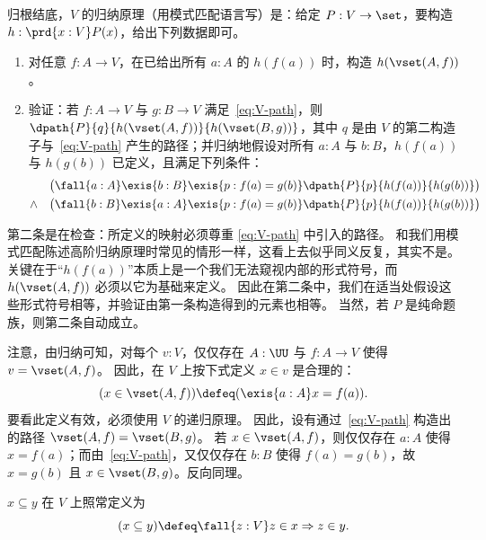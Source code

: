 %
归根结底，$V$ 的归纳原理（用模式匹配语言写）是：给定 $P:V\to \set$，要构造 $h:\prd{x:V} P(x)$，给出下列数据即可。
\begin{enumerate}
\item 对任意 $f:A\to V$，在已给出所有 $a:A$ 的 $h(f(a))$ 时，构造 $h(\vset(A,f))$。
\item 验证：若 $f : A \to V$ 与 $g : B \to V$ 满足~\eqref{eq:V-path}，则 $\dpath{P}{q}{h(\vset(A,f))}{h(\vset(B,g))}$，其中 $q$ 是由 $V$ 的第二构造子与~\eqref{eq:V-path} 产生的路径；并归纳地假设对所有 $a:A$ 与 $b:B$，$h(f(a))$ 与 $h(g(b))$ 已定义，且满足下列条件：
\begin{eqnarray*}
    &       & \big(\fall{a:A} \exis{b:B} \exis{p:f(a)=g(b)} \dpath{P}{p}{h(f(a))}{h(g(b))}\big) \\
    & \land & \big(\fall{b:B} \exis{a:A} \exis{p:f(a)=g(b)} \dpath{P}{p}{h(f(a))}{h(g(b))}\big)
\end{eqnarray*}
\end{enumerate}
第二条是在检查：所定义的映射必须尊重 \eqref{eq:V-path} 中引入的路径。
和我们用模式匹配陈述高阶归纳原理时常见的情形一样，这看上去似乎同义反复，其实不是。
关键在于“$h(f(a))$”本质上是一个我们无法窥视内部的形式符号，而 $h(\vset(A,f))$ 必须以它为基础来定义。
因此在第二条中，我们在适当处假设这些形式符号相等，并验证由第一条构造得到的元素也相等。
当然，若 $P$ 是纯命题族，则第二条自动成立。

注意，由归纳可知，对每个 $v:V$，仅仅存在 $A:\UU$ 与 $f:A\to V$ 使得 $v=\vset(A,f)$。
因此，在 $V$ 上按下式定义
%
$x\in v$ 是合理的：
%
%
\begin{equation*}
  (x \in \vset(A,f)) \defeq (\exis{a : A} x = f(a)).
\end{equation*}
%
要看此定义有效，必须使用 $V$ 的递归原理。
因此，设有通过~\eqref{eq:V-path} 构造出的路径 $\vset(A, f) = \vset(B, g)$。
若 $x \in \vset(A,f)$，则仅仅存在 $a : A$ 使得 $x = f(a)$；而由~\eqref{eq:V-path}，又仅仅存在 $b : B$ 使得 $f(a) = g(b)$，故
$x = g(b)$ 且 $x \in \vset(B,g)$。反向同理。

%
$x\subseteq y$ 在 $V$ 上照常定义为
%
\begin{equation*}
  (x \subseteq y) \defeq \fall{z : V} z \in x \Rightarrow z \in y.
\end{equation*}

